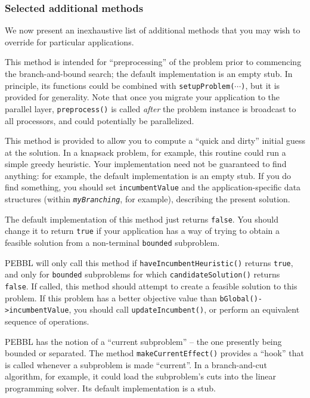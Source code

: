 \subsubsection{Selected additional methods}
\label{sec:seradd}
We now present an inexhaustive list of additional methods that you may
wish to override for particular applications.

This method is intended for ``preprocessing'' of the problem prior to
commencing the branch-and-bound search; the default implementation is
an empty stub.  In principle, its functions
could be combined with \texttt{setupProblem($\cdots$)}, but it is
provided for generality.  Note that once you migrate your application
to the parallel layer, \texttt{preprocess()} is called \emph{after}
the problem instance is broadcast to all processors, and could
potentially be parallelized.

This method is provided to
allow you to compute a ``quick and dirty'' initial guess at the
solution.  In a knapsack problem, for example, this routine could run
a simple greedy heuristic.  Your implementation need not be guaranteed
to find anything: for example, the default implementation is an empty
stub.  If you do find something, you should set
\texttt{incumbentValue} and the application-specific data structures
(within \texttt{\emph{myBranching}}, for example), describing the
present solution.

The default implementation of this method just returns \texttt{false}.
You should change it to return \texttt{true} if your application has a
way of trying to obtain a feasible solution from a non-terminal
\texttt{bounded} subproblem.  

PEBBL will only call
this method if \texttt{haveIncumbentHeuristic()} returns \texttt{true},
and only for \texttt{bounded} subproblems for which
\texttt{candidateSolution()} returns \texttt{false}.  If called, this
method should attempt to create a feasible solution to this 
problem.  If this problem has a better objective value than
\texttt{bGlobal()->incumbentValue}, you should call
\texttt{updateIncumbent()}, or perform an equivalent sequence of
operations. 

PEBBL has the notion of a ``current subproblem'' -- the one presently
being bounded or separated.  The method \texttt{makeCurrentEffect()}
provides a ``hook'' that is called whenever a subproblem is made
``current''.  In a branch-and-cut algorithm, for example, it could
load the subproblem's cuts into the linear programming solver.  Its
default implementation is a stub.

